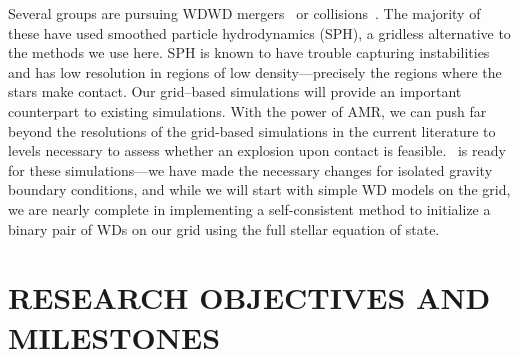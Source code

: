 \documentclass[11pt,letterpaper,english]{article}
\begin{document}
Several groups are pursuing WDWD 
mergers~\cite{yoon:2007,motl:2007,loren-aguilar:2009,shenetal+11} or
collisions~\cite{raskinetal+10,loren-aguilar:2010,rosswog:2009}. The
majority of these have used smoothed particle hydrodynamics (SPH), a
gridless alternative to the methods we use here.  SPH is known to have
trouble capturing instabilities and has low resolution in regions of
low density---precisely the regions where the stars make contact.  Our
grid--based simulations will provide an important counterpart to
existing simulations.  With the power of AMR, we can push far beyond
the resolutions of the grid-based simulations in the current
literature to levels necessary to assess whether an explosion upon
contact is feasible. \castro\ is ready for these simulations---we have
made the necessary changes for isolated gravity boundary conditions,
and while we will start with simple WD models on the grid, we are
nearly complete in implementing a self-consistent method to initialize a binary
pair of WDs on our grid using the full stellar equation of state.



\section{RESEARCH OBJECTIVES AND MILESTONES }  








\end{document}
